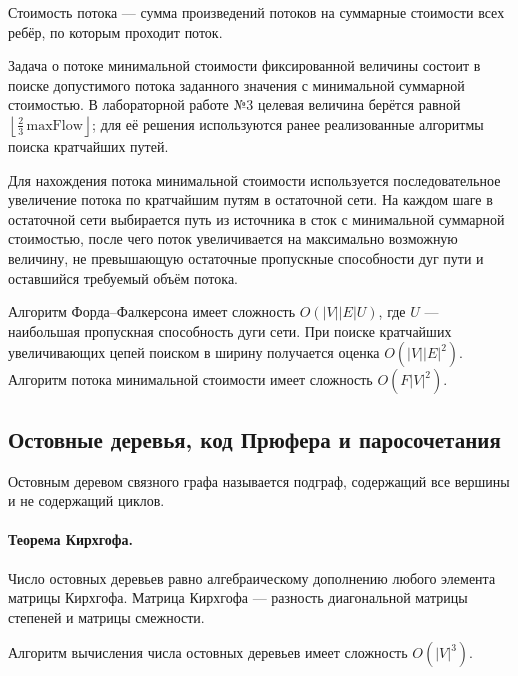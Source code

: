 \documentclass[14pt,a4paper]{extarticle}
\begin{document}

Стоимость потока --- сумма произведений потоков на суммарные стоимости всех ребёр, по которым проходит поток.

Задача о потоке минимальной стоимости фиксированной величины состоит в поиске допустимого потока заданного значения с минимальной суммарной стоимостью. В лабораторной работе №3 целевая величина берётся равной \(\left\lfloor \frac{2}{3}\,\text{maxFlow} \right\rfloor\); для её решения используются ранее реализованные алгоритмы поиска кратчайших путей.

Для нахождения потока минимальной стоимости используется последовательное увеличение потока по кратчайшим путям в остаточной сети. На каждом шаге в остаточной сети выбирается путь из источника в сток с минимальной суммарной стоимостью, после чего поток увеличивается на максимально возможную величину, не превышающую остаточные пропускные способности дуг пути и оставшийся требуемый объём потока.

Алгоритм Форда--Фалкерсона имеет сложность \(O(|V||E|U)\), где \(U\) --- наибольшая пропускная способность дуги сети. При поиске кратчайших увеличивающих цепей поиском в ширину получается оценка \(O(|V||E|^2)\). Алгоритм потока минимальной стоимости имеет сложность \(O(F|V|^2)\).

\subsection{Остовные деревья, код Прюфера и паросочетания}

Остовным деревом связного графа называется подграф, содержащий все вершины и не содержащий циклов. 

\paragraph{Теорема Кирхгофа.} Число остовных деревьев равно алгебраическому дополнению любого элемента матрицы Кирхгофа. Матрица Кирхгофа --- разность диагональной матрицы степеней и матрицы смежности.

Алгоритм вычисления числа остовных деревьев имеет сложность \(O(|V|^3)\).
\end{document}
